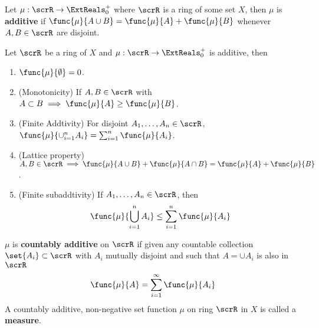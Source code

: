 \begin{definition}
    Let \(\mu:\scrR \to \ExtReals^+_0\) where \(\scrR\) is a ring of some set \(X\), then \(\mu\) is \textbf{additive} if \(\func{\mu}{A \cup B} = \func{\mu}{A} + \func{\mu}{B}\) whenever \(A,B \in \scrR\) are disjoint.
\end{definition}

\begin{proposition}
    Let \(\scrR\) be a ring of \(X\) and \(\mu: \scrR \to \ExtReals^+_0\) is additive, then 
    \begin{enumerate}
        \item \(\func{\mu}{\emptyset} = 0\).
        \item (Monotonicity) If \(A,B \in \scrR\) with \(A \subset B \implies \func{\mu}{A} \geq \func{\mu}{B}\).
        \item (Finite Addtivity) For disjoint \(A_1, \dots , A_n \in \scrR\), \(\func{\mu}{\cup_{i = 1}^n A_i} = \sum_{i = 1}^n \func{\mu}{A_i}\).
        \item (Lattice property) \(A,B \in \scrR \implies \func{\mu}{A \cup B} + \func{\mu}{A \cap B} = \func{\mu}{A} + \func{\mu}{B}\).
        \item (Finite subaddtivity) If \(A_1, \dots , A_n \in \scrR\), then 
        \begin{equation*}
            \func{\mu}{\bigcup_{i = 1}^n A_i} \leq \sum_{i = 1}^n \func{\mu}{A_i}
        \end{equation*}
    \end{enumerate}
\end{proposition}

\begin{definition}
    \(\mu\) is \textbf{countably additive} on \(\scrR\) if given any countable collection \(\set{A_i} \subset \scrR\) with \(A_i\) mutually disjoint and such that \(A = \cup A_i\) is also in \(\scrR\)
    \begin{equation*}
        \func{\mu}{A} = \sum_{i = 1}^{\infty} \func{\mu}{A_i}
    \end{equation*}
    A countably additive, non-negative set function \(\mu\) on ring \(\scrR\) in \(X\) is called a \textbf{measure}.
\end{definition}

